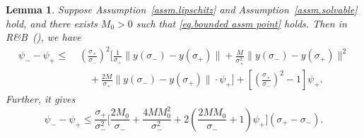 \documentclass{article}
\newtheorem{lemma}[theorem]{Lemma}
\numberwithin{equation}{section}
\numberwithin{equation}{section}
\begin{document}
\begin{lemma}
    \label{lem.bound gap bisection}
    Suppose Assumption~\ref{assm.lipschitz} and Assumption~\ref{assm.solvable} hold, and there exists $M_0>0$ such that \eqref{eq.bounded assm point} holds. Then in \textnormal{R\&B}~(), we have
    \begin{equation}\label{eq.bound gap bisection}
        \begin{aligned}
            \psi_- - \psi_+
            \leq\; & \left( \frac{\sigma_+}{\sigma_-} \right)^2 \Bigg[
                \frac{1}{\sigma_+} \|y(\sigma_-)-y(\sigma_+)\|
            + \frac{M}{\sigma_+^2} \|y(\sigma_-)-y(\sigma_+)\|^2                          \\
                   & \quad + \frac{2M}{\sigma_+} \|y(\sigma_-)-y(\sigma_+)\| \cdot \psi_+
                \Bigg]
            + \left[ \left( \frac{\sigma_+}{\sigma_-} \right)^2 - 1 \right] \psi_+.
        \end{aligned}
    \end{equation}
    Further, it gives
    \begin{equation}
        \label{eq.bounded gap bisection sigma}
        \psi_- - \psi_+
        \leq
        \frac{\sigma_+}{\sigma_-^2}
        \Bigg[
            \frac{2M_0}{\sigma_-}
            +
            \frac{4MM_0^2}{\sigma_-^2}
            +
            2\left(
            \frac{2MM_0}{\sigma_-}+1
            \right)\psi_+
            \Bigg]
        (\sigma_+-\sigma_-).
    \end{equation}
\end{lemma}
\end{document}
